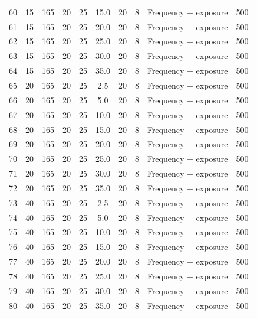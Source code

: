 \documentclass[
]{article}
\begin{document}
\begin{table}[H]
\begin{tabular}{cccccccccc}
60 & 15 & 165 & 20 & 25 & 15.0 & 20 & 8 & Frequency + exposure & 500\\
\rowcolor{gray!6}  61 & 15 & 165 & 20 & 25 & 20.0 & 20 & 8 & Frequency + exposure & 500\\
62 & 15 & 165 & 20 & 25 & 25.0 & 20 & 8 & Frequency + exposure & 500\\
\rowcolor{gray!6}  63 & 15 & 165 & 20 & 25 & 30.0 & 20 & 8 & Frequency + exposure & 500\\
64 & 15 & 165 & 20 & 25 & 35.0 & 20 & 8 & Frequency + exposure & 500\\
\rowcolor{gray!6}  65 & 20 & 165 & 20 & 25 & 2.5 & 20 & 8 & Frequency + exposure & 500\\
66 & 20 & 165 & 20 & 25 & 5.0 & 20 & 8 & Frequency + exposure & 500\\
\rowcolor{gray!6}  67 & 20 & 165 & 20 & 25 & 10.0 & 20 & 8 & Frequency + exposure & 500\\
68 & 20 & 165 & 20 & 25 & 15.0 & 20 & 8 & Frequency + exposure & 500\\
\rowcolor{gray!6}  69 & 20 & 165 & 20 & 25 & 20.0 & 20 & 8 & Frequency + exposure & 500\\
70 & 20 & 165 & 20 & 25 & 25.0 & 20 & 8 & Frequency + exposure & 500\\
\rowcolor{gray!6}  71 & 20 & 165 & 20 & 25 & 30.0 & 20 & 8 & Frequency + exposure & 500\\
72 & 20 & 165 & 20 & 25 & 35.0 & 20 & 8 & Frequency + exposure & 500\\
\rowcolor{gray!6}  73 & 40 & 165 & 20 & 25 & 2.5 & 20 & 8 & Frequency + exposure & 500\\
74 & 40 & 165 & 20 & 25 & 5.0 & 20 & 8 & Frequency + exposure & 500\\
\rowcolor{gray!6}  75 & 40 & 165 & 20 & 25 & 10.0 & 20 & 8 & Frequency + exposure & 500\\
76 & 40 & 165 & 20 & 25 & 15.0 & 20 & 8 & Frequency + exposure & 500\\
\rowcolor{gray!6}  77 & 40 & 165 & 20 & 25 & 20.0 & 20 & 8 & Frequency + exposure & 500\\
78 & 40 & 165 & 20 & 25 & 25.0 & 20 & 8 & Frequency + exposure & 500\\
\rowcolor{gray!6}  79 & 40 & 165 & 20 & 25 & 30.0 & 20 & 8 & Frequency + exposure & 500\\
80 & 40 & 165 & 20 & 25 & 35.0 & 20 & 8 & Frequency + exposure & 500\\
\bottomrule
\end{tabular}
\end{table}
\end{document}
